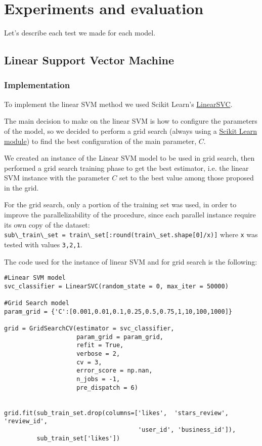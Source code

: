 
\section{Experiments and evaluation}\label{sec:experiments}

Let's describe each test we made for each model.

\subsection{Linear Support Vector Machine}\label{sec:svm}

\subsubsection{Implementation}

To implement the linear SVM method we used Scikit Learn's \href{https://scikit-learn.org/stable/modules/generated/sklearn.svm.LinearSVC.html}{LinearSVC}.

The main decision to make on the linear SVM is how to configure the parameters of the model, so we decided to perform a grid search (always using a \href{https://scikit-learn.org/stable/modules/generated/sklearn.model_selection.GridSearchCV.html}{Scikit Learn module}) to find the best configuration of the main parameter, $C$.

We created an instance of the Linear SVM model to be used in grid search, then performed a grid search training phase to get the best estimator, i.e. the linear SVM instance with the parameter $C$ set to the best value among those proposed in the grid.

For the grid search, only a portion of the training set was used, in order to improve the parallelizability of the procedure, since each parallel instance require its own copy of the dataset:\\
\colorbox{backgray}{\lstinline|sub\_train\_set = train\_set[:round(train\_set.shape[0]/x)]|}
where \texttt{x} was tested with values \texttt{3,2,1}.

The code used for the instance of linear SVM and for grid search is the following:

\begin{lstlisting}[caption={Linear SVM model},label={lst:svm-model}]
#Linear SVM model
svc_classifier = LinearSVC(random_state = 0, max_iter = 50000)

#Grid Search model
param_grid = {'C':[0.001,0.01,0.1,0.25,0.5,0.75,1,10,100,1000]}

grid = GridSearchCV(estimator = svc_classifier, 
                    param_grid = param_grid, 
                    refit = True, 
                    verbose = 2, 
                    cv = 3, 
                    error_score = np.nan, 
                    n_jobs = -1, 
                    pre_dispatch = 6)


grid.fit(sub_train_set.drop(columns=['likes',  'stars_review', 'review_id',
                                     'user_id', 'business_id']), 
         sub_train_set['likes'])                     
\end{lstlisting} 

